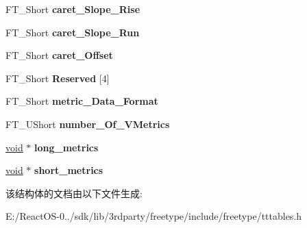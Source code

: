 \begin{DoxyCompactItemize}
\item 
\mbox{\label{struct_t_t___vert_header___a3218533a7d8ac5a8ebd70a970cbdbbcc}} 
F\+T\+\_\+\+Short {\bfseries caret\+\_\+\+Slope\+\_\+\+Rise}
\item 
\mbox{\label{struct_t_t___vert_header___a98ff91b532d827440f7140d3071d473d}} 
F\+T\+\_\+\+Short {\bfseries caret\+\_\+\+Slope\+\_\+\+Run}
\item 
\mbox{\label{struct_t_t___vert_header___a89ff9369f61dc5b770cde0eda954d402}} 
F\+T\+\_\+\+Short {\bfseries caret\+\_\+\+Offset}
\item 
\mbox{\label{struct_t_t___vert_header___a54930b56bb8be0a8eb22753a9242fc5f}} 
F\+T\+\_\+\+Short {\bfseries Reserved} \mbox{[}4\mbox{]}
\item 
\mbox{\label{struct_t_t___vert_header___aa7c3983f62f7bf736eaaaae684b65dd7}} 
F\+T\+\_\+\+Short {\bfseries metric\+\_\+\+Data\+\_\+\+Format}
\item 
\mbox{\label{struct_t_t___vert_header___a4ca6fe9cdd12fbc9a1129c4fbf6bddd1}} 
F\+T\+\_\+\+U\+Short {\bfseries number\+\_\+\+Of\+\_\+\+V\+Metrics}
\item 
\mbox{\label{struct_t_t___vert_header___ac789245d0d6243bc965ad43702bdc671}} 
\hyperlink{interfacevoid}{void} $\ast$ {\bfseries long\+\_\+metrics}
\item 
\mbox{\label{struct_t_t___vert_header___ad5e875c19a02b0f6777db1c122bff2f3}} 
\hyperlink{interfacevoid}{void} $\ast$ {\bfseries short\+\_\+metrics}
\end{DoxyCompactItemize}


该结构体的文档由以下文件生成\+:\begin{DoxyCompactItemize}
\item 
E\+:/\+React\+O\+S-\/0../sdk/lib/3rdparty/freetype/include/freetype/tttables.\+h\end{DoxyCompactItemize}
